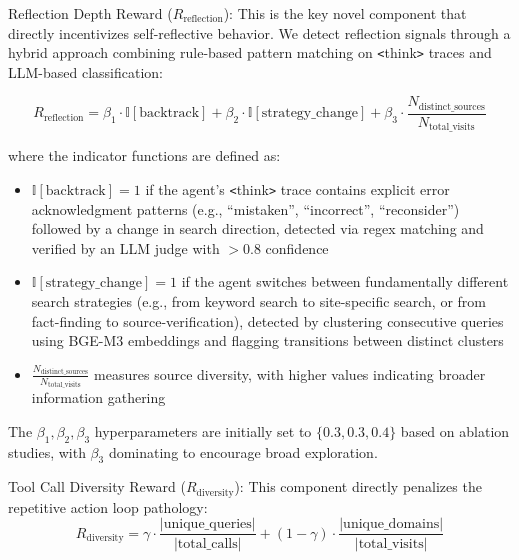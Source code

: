 \documentclass[notspecified,article,accept,pdftex,moreauthors]{Definitions/mdpi}
\renewcommand{\textbf}[1]{#1}
\begin{document}
\textbf{Reflection Depth Reward ($R_{\text{reflection}}$):} This is the key novel component that directly incentivizes self-reflective behavior. We detect reflection signals through a hybrid approach combining rule-based pattern matching on \texttt{<}think\texttt{>} traces and LLM-based classification:

\begin{equation}
R_{\text{reflection}} = \beta_1 \cdot \mathbb{I}[\text{backtrack}] + \beta_2 \cdot \mathbb{I}[\text{strategy\_change}] + \beta_3 \cdot \frac{N_{\text{distinct\_sources}}}{N_{\text{total\_visits}}}
\label{eq:reflection-reward}
\end{equation}

where the indicator functions are defined as:
\begin{itemize}
    \item $\mathbb{I}[\text{backtrack}] = 1$ if the agent's \texttt{<}think\texttt{>} trace contains explicit error acknowledgment patterns (e.g., ``mistaken'', ``incorrect'', ``reconsider'') followed by a change in search direction, detected via regex matching and verified by an LLM judge with $>0.8$ confidence
    \item $\mathbb{I}[\text{strategy\_change}] = 1$ if the agent switches between fundamentally different search strategies (e.g., from keyword search to site-specific search, or from fact-finding to source-verification), detected by clustering consecutive queries using BGE-M3 embeddings and flagging transitions between distinct clusters
    \item $\frac{N_{\text{distinct\_sources}}}{N_{\text{total\_visits}}}$ measures source diversity, with higher values indicating broader information gathering
\end{itemize}

The $\beta_1, \beta_2, \beta_3$ hyperparameters are initially set to $\{0.3, 0.3, 0.4\}$ based on ablation studies, with $\beta_3$ dominating to encourage broad exploration.

\textbf{Tool Call Diversity Reward ($R_{\text{diversity}}$):} This component directly penalizes the repetitive action loop pathology:
\begin{equation}
R_{\text{diversity}} = \gamma \cdot \frac{|\text{unique\_queries}|}{|\text{total\_calls}|} + (1-\gamma) \cdot \frac{|\text{unique\_domains}|}{|\text{total\_visits}|}
\label{eq:diversity-reward}
\end{equation}
\end{document}
